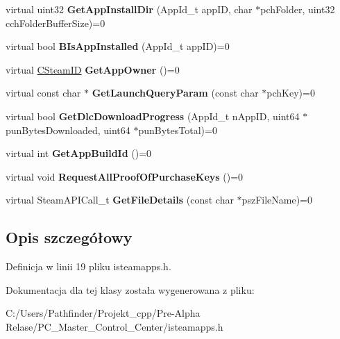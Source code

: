 \begin{DoxyCompactItemize}
\mbox{\label{class_i_steam_apps_a86c5be43cca3fa093e598eb57b42597f}} 
virtual uint32 {\bfseries Get\+App\+Install\+Dir} (App\+Id\+\_\+t app\+ID, char $\ast$pch\+Folder, uint32 cch\+Folder\+Buffer\+Size)=0
\item 
\mbox{\label{class_i_steam_apps_afb81b0d67c2922fd2b873d9e5b5d14b3}} 
virtual bool {\bfseries B\+Is\+App\+Installed} (App\+Id\+\_\+t app\+ID)=0
\item 
\mbox{\label{class_i_steam_apps_ae0a88dea59c107a672a6f094bd0d4918}} 
virtual \hyperlink{class_c_steam_i_d}{C\+Steam\+ID} {\bfseries Get\+App\+Owner} ()=0
\item 
\mbox{\label{class_i_steam_apps_a1059376db03a5a9770261c9f84673bab}} 
virtual const char $\ast$ {\bfseries Get\+Launch\+Query\+Param} (const char $\ast$pch\+Key)=0
\item 
\mbox{\label{class_i_steam_apps_acc1761598473891e65deecd0d0ec504c}} 
virtual bool {\bfseries Get\+Dlc\+Download\+Progress} (App\+Id\+\_\+t n\+App\+ID, uint64 $\ast$pun\+Bytes\+Downloaded, uint64 $\ast$pun\+Bytes\+Total)=0
\item 
\mbox{\label{class_i_steam_apps_a0216a1584a17fd771bddc64a453052b8}} 
virtual int {\bfseries Get\+App\+Build\+Id} ()=0
\item 
\mbox{\label{class_i_steam_apps_a1e2da11ac1323d3eee78c65bf81c563c}} 
virtual void {\bfseries Request\+All\+Proof\+Of\+Purchase\+Keys} ()=0
\item 
\mbox{\label{class_i_steam_apps_ab561e30095784ddfa7a128353a55716d}} 
virtual Steam\+A\+P\+I\+Call\+\_\+t {\bfseries Get\+File\+Details} (const char $\ast$psz\+File\+Name)=0
\end{DoxyCompactItemize}


\subsection{Opis szczegółowy}


Definicja w linii 19 pliku isteamapps.\+h.



Dokumentacja dla tej klasy została wygenerowana z pliku\+:\begin{DoxyCompactItemize}
\item 
C\+:/\+Users/\+Pathfinder/\+Projekt\+\_\+cpp/\+Pre-\/\+Alpha Relase/\+P\+C\+\_\+\+Master\+\_\+\+Control\+\_\+\+Center/isteamapps.\+h\end{DoxyCompactItemize}
